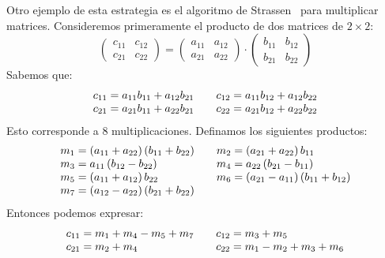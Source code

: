   Otro ejemplo de esta estrategia es el algoritmo de Strassen~%
    \cite{strassen69:_matrix_multiplication}%
  para multiplicar matrices.
  Consideremos primeramente
  el producto de dos matrices de \(2 \times 2\):
  \begin{equation*}
    \begin{pmatrix}
      c_{1 1} & c_{1 2} \\
      c_{2 1} & c_{2 2}
    \end{pmatrix}
      = \begin{pmatrix}
	  a_{1 1} & a_{1 2} \\
	  a_{2 1} & a_{2 2}
	\end{pmatrix}
	  \cdot
	    \begin{pmatrix}
	      b_{1 1} & b_{1 2} \\
	      b_{2 1} & b_{2 2}
	    \end{pmatrix}
  \end{equation*}
  Sabemos que:
  \begin{equation*}
    \begin{array}{l@{\qquad}l}
      c_{1 1}
	= a_{1 1} b_{1 1} + a_{1 2} b_{2 1} &
      c_{1 2}
	= a_{1 1} b_{1 2} + a_{1 2} b_{2 2} \\
      c_{2 1}
	= a_{2 1} b_{1 1} + a_{2 2} b_{2 1} &
      c_{2 2}
	= a_{2 1} b_{1 2} + a_{2 2} b_{2 2}
    \end{array}
  \end{equation*}
  Esto corresponde a \(8\) multiplicaciones.
  Definamos los siguientes productos:
  \begin{equation*}
    \begin{array}{l@{\qquad}l}
      m_1
	= (a_{1 1} + a_{2 2}) \, (b_{1 1} + b_{2 2}) &
      m_2
       = (a_{2 1} + a_{2 2}) \, b_{1 1} \\
      m_3
       = a_{1 1} \, (b_{1 2} - b_{2 2}) &
      m_4
       = a_{2 2} \, (b_{2 1} - b_{1 1}) \\
      m_5
       = (a_{1 1} + a_{1 2}) \, b_{2 2} &
      m_6
       = (a_{2 1} - a_{1 1}) \, (b_{1 1} + b_{1 2}) \\
      m_7
       = (a_{1 2} - a_{2 2}) \, (b_{2 1} + b_{2 2})
    \end{array}
  \end{equation*}
  Entonces podemos expresar:
  \begin{align*}
    \begin{array}{l@{\qquad}l}
      c_{1 1}
	= m_1 + m_4 - m_5 + m_7 &
      c_{1 2}
	= m_3 + m_5 \\
      c_{2 1}
	= m_2 + m_4 &
      c_{2 2}
	= m_1 - m_2 + m_3 + m_6
    \end{array}
  \end{align*}
